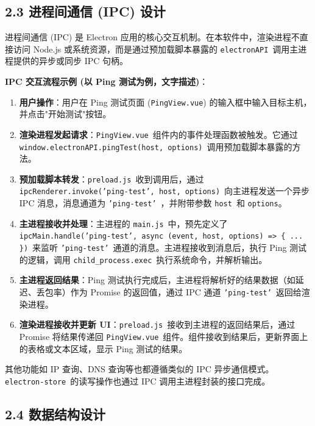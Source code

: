 \documentclass{article}
\begin{document}
\subsection*{2.3 进程间通信 (IPC) 设计}

进程间通信 (IPC) 是 Electron 应用的核心交互机制。在本软件中，渲染进程不直接访问 Node.js 或系统资源，而是通过预加载脚本暴露的 \texttt{electronAPI}\ 调用主进程提供的异步或同步 IPC 句柄。

\textbf{IPC 交互流程示例 (以 Ping 测试为例，文字描述)}：

\begin{enumerate}[label=\arabic*.]
    \item \textbf{用户操作}：用户在 Ping 测试页面 (\texttt{PingView.vue}) 的输入框中输入目标主机，并点击"开始测试"按钮。
    \item \textbf{渲染进程发起请求}：\texttt{PingView.vue}\ 组件内的事件处理函数被触发。它通过 \texttt{window.electronAPI.pingTest(host, options)}\ 调用预加载脚本暴露的方法。
    \item \textbf{预加载脚本转发}：\texttt{preload.js}\ 收到调用后，通过 \texttt{ipcRenderer.invoke('ping-test', host, options)}\ 向主进程发送一个异步 IPC 消息，消息通道为 \texttt{'ping-test'}\ ，并附带参数 \texttt{host}\ 和 \texttt{options}。
    \item \textbf{主进程接收并处理}：主进程的 \texttt{main.js}\ 中，预先定义了 \texttt{ipcMain.handle('ping-test', async (event, host, options) => \{ ... \})}\ 来监听 \texttt{'ping-test'}\ 通道的消息。主进程接收到消息后，执行 Ping 测试的逻辑，调用 \texttt{child\_process.exec}\ 执行系统命令，并解析输出。
    \item \textbf{主进程返回结果}：Ping 测试执行完成后，主进程将解析好的结果数据（如延迟、丢包率）作为 Promise 的返回值，通过 IPC 通道 \texttt{'ping-test'}\ 返回给渲染进程。
    \item \textbf{渲染进程接收并更新 UI}：\texttt{preload.js}\ 接收到主进程的返回结果后，通过 Promise 将结果传递回 \texttt{PingView.vue}\ 组件。组件接收到结果后，更新界面上的表格或文本区域，显示 Ping 测试的结果。
\end{enumerate}

其他功能如 IP 查询、DNS 查询等也都遵循类似的 IPC 异步通信模式。\texttt{electron-store}\ 的读写操作也通过 IPC 调用主进程封装的接口完成。

\subsection*{2.4 数据结构设计}
\end{document}
